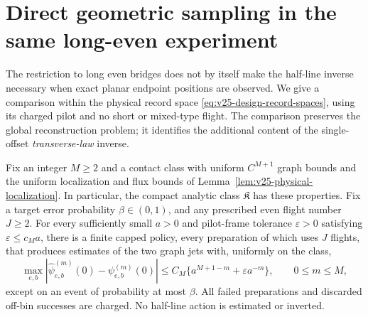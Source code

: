 \section{Direct geometric sampling in the same long-even experiment}
\label{sec:v26-position-benchmark}

The restriction to long even bridges does not by itself make the half-line
inverse necessary when exact planar endpoint positions are observed.
We give a comparison within the physical record space
\eqref{eq:v25-design-record-spaces}, using its charged pilot and no short
or mixed-type flight.  The comparison preserves the global reconstruction
problem; it identifies the additional content of the single-offset
\emph{transverse-law} inverse.

\begin{proposition}
\label{prop:v26-position-jets}
Fix an integer \(M\ge2\) and a contact class with uniform \(C^{M+1}\)
graph bounds and the uniform localization and flux bounds of
Lemma~\ref{lem:v25-physical-localization}.  In particular, the compact
analytic class \(\mathfrak K\) has these properties.  Fix a target
error probability \(\beta\in(0,1)\), and any prescribed even flight number
\(J\ge2\).  For every sufficiently small \(a>0\) and pilot-frame tolerance
\(\varepsilon>0\) satisfying \(\varepsilon\le c_Ma\), there is a finite
capped policy, every preparation of which uses \(J\) flights, that produces
estimates of the two graph jets with, uniformly on the class,
\begin{equation}\label{eq:v26-interpolation-error}
 \max_{e,b}\left|\widehat\psi_{e,b}^{(m)}(0)
                   -\psi_{e,b}^{(m)}(0)\right|
 \le C_M\{a^{M+1-m}+\varepsilon a^{-m}\},\qquad 0\le m\le M,
\end{equation}
except on an event of probability at most \(\beta\).  All failed
preparations and discarded off-bin successes are charged.  No half-line
action is estimated or inverted.
\end{proposition}

